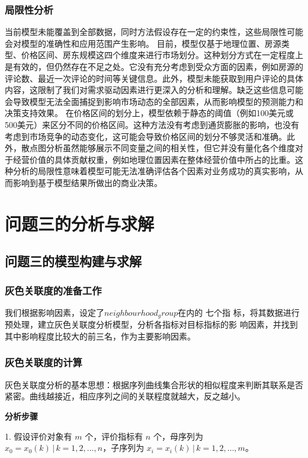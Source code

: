 \documentclass[12pt]{article}
\begin{document}
\begin{CJK}{UTF8}{gbsn}
	\subsubsection{局限性分析}
	当前模型未能覆盖到全部数据，同时方法假设存在一定的约束性，这些局限性可能会对模型的准确性和应用范围产生影响。
	目前，模型仅基于地理位置、房源类型、价格区间、房东规模这四个维度来进行市场划分。这种划分方式在一定程度上是有效的，但仍然存在不足之处。它没有充分考虑到受众方面的因素，例如房源的评论数、最近一次评论的时间等关键信息。此外，模型未能获取到用户评论的具体内容，这限制了我们对需求驱动因素进行更深入的分析和理解。缺乏这些信息可能会导致模型无法全面捕捉到影响市场动态的全部因素，从而影响模型的预测能力和决策支持效果。
	在价格区间的划分上，模型依赖于静态的阈值（例如100美元或500美元）来区分不同的价格区间。这种方法没有考虑到通货膨胀的影响，也没有考虑到市场竞争的动态变化，这可能会导致价格区间的划分不够灵活和准确。此外，散点图分析虽然能够展示不同变量之间的相关性，但它并没有量化各个维度对于经营价值的具体贡献权重，例如地理位置因素在整体经营价值中所占的比重。这种分析的局限性意味着模型可能无法准确评估各个因素对业务成功的真实影响，从而影响到基于模型结果所做出的商业决策。
	
	\section{问题三的分析与求解}
	\subsection{问题三的模型构建与求解}
	
	\subsubsection{灰色关联度的准备工作}
	
	我们根据影响因素，设定了$neighbourhood_group$在内的 七个指 标，将其数据进行预处理，建立灰色关联度分析模型，分析各指标对目标指标的影 响因素，并找到其中影响程度比较大的前三名，作为主要影响因素。
	\subsubsection{灰色关联度的计算}
	灰色关联度分析的基本思想：根据序列曲线集合形状的相似程度来判断其联系是否紧密。曲线越接近，相应序列之间的关联程度就越大，反之越小。
	
	\textbf{分析步骤}
	
	1. 假设评价对象有 $m$ 个，评价指标有 $n$ 个，母序列为 $x_0 = x_0(k) \, | \, k = 1, 2, \dots, n$，子序列为 $x_i = x_i(k) \, | \, k = 1, 2, \dots, m$。
	

\end{CJK}
\end{document}
